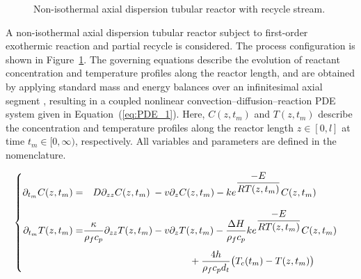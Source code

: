 \begin{figure}[!htbp]
    \caption{Non-isothermal axial dispersion tubular reactor with recycle stream.}
    \label{fig:reactor_scheme}
\end{figure}


A non-isothermal axial dispersion tubular reactor subject to first-order exothermic reaction and partial recycle is considered. The process configuration is shown in Figure~\ref{fig:reactor_scheme}. The governing equations describe the evolution of reactant concentration and temperature profiles along the reactor length, and are obtained by applying standard mass and energy balances over an infinitesimal axial segment \autocite{levenspiel1998chemical}, resulting in a coupled nonlinear convection--diffusion--reaction PDE system given in Equation~(\ref{eq:PDE_1}). Here, $C(z, t_m)$ and $T(z, t_m)$ describe the concentration and temperature profiles along the reactor length $z \in [0, l]$ at time $t_m \in [0, \infty)$, respectively. All variables and parameters are defined in the nomenclature.

\begin{equation} \label{eq:PDE_1}
\begin{cases}
\begin{alignedat}{2}
    \partial_{t_m} C(z, t_m) = &\hspace{1em} D \partial_{zz} C(z, t_m)              &&- v \partial_{z} C(z, t_m) -                              k e^{\dfrac{-E}{R T(z, t_m)}} C(z, t_m)\\[2.0ex]
    \partial_{t_m} T(z, t_m) = &\dfrac{\kappa}{\rho_f c_p} \partial_{zz} T(z, t_m) &&- v \partial_{z} T(z, t_m) - \dfrac{\Delta H}{\rho_f c_p} k e^{\dfrac{-E}{R T(z, t_m)}} C(z, t_m)\\[1.2ex]
    &&& \hspace{3.8em} + \dfrac{4h}{\rho_f c_p d_t} \bigl( T_c(t_m) - T(z, t_m) \bigr) \\
\end{alignedat}
\end{cases}
\end{equation}

